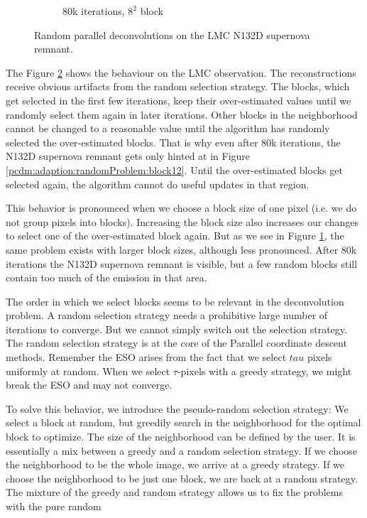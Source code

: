 \begin{figure}[h]
\begin{subfigure}[b]{0.2405\linewidth}
		\caption{80k iterations, $8^2$ block}
		\label{pcdm:adaption:randomProblem:block82}
	\end{subfigure}
	\caption{Random parallel deconvolutions on the LMC N132D supernova remnant.}
	\label{pcdm:adaption:randomProblem}
\end{figure}

The Figure \ref{pcdm:adaption:randomProblem} shows the behaviour on the LMC observation. The reconstructions receive obvious artifacts from the random selection strategy. The blocks, which get selected in the first few iterations, keep their over-estimated values until we randomly select them again in later iterations. Other blocks in the neighborhood cannot be changed to a reasonable value until the algorithm has randomly selected the over-estimated blocks. That is why even after 80k iterations, the N132D supernova remnant gets only hinted at in Figure \ref{pcdm:adaption:randomProblem:block12}. Until the over-estimated blocks get selected again, the algorithm cannot do useful updates in that region.

This behavior is pronounced when we choose a block size of one pixel (i.e. we do not group pixels into blocks). Increasing the block size also increases our changes to select one of the over-estimated block again. But as we see in Figure \ref{pcdm:adaption:randomProblem:block82}, the same problem exists with larger block sizes, although less pronounced. After 80k iterations the N132D supernova remnant is visible, but a few random blocks still contain too much of the emission in that area.

The order in which we select blocks seems to be relevant in the deconvolution problem. A random selection strategy needs a prohibitive large number of iterations to converge. But we cannot simply switch out the selection strategy. The random selection strategy is at the core of the Parallel coordinate descent methods. Remember the ESO arises from the fact that we select $tau$ pixels uniformly at random. When we select $\tau$-pixels with a greedy strategy, we might break the ESO and may not converge.

To solve this behavior, we introduce the pseudo-random selection strategy:  We select a block at random, but greedily search in the neighborhood for the optimal block to optimize. The size of the neighborhood can be defined by the user. It is essentially a mix between a greedy and a random selection strategy. If we choose the neighborhood to be the whole image, we arrive at a greedy strategy. If we choose the neighborhood to be just one block, we are back at a random strategy. The mixture of the greedy and random strategy allows us to fix the problems with the pure random

